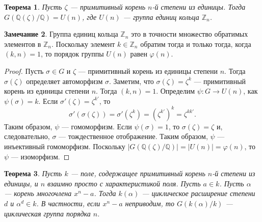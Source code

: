 \documentclass[12pt, titlepage, oneside]{amsbook}
\newcommand{\ZZ}{\mathbb{Z}}
\newcommand{\QQ}{\mathbb{Q}}
\newtheorem{theorem}{Теорема}[chapter]
\theoremstyle{definition}
\newtheorem{remark}[theorem]{Замечание}
\theoremstyle{remark}
\begin{document}
\begin{theorem}
\label{Edin2}
Пусть $\zeta$ --- примитивный корень $n$-й степени из единицы. Тогда $G(\QQ(\zeta)/\QQ)=U(n)$, где $U(n)$ --- группа единиц кольца $\ZZ_n$.
\end{theorem}

\begin{remark}
Группа единиц кольца $\ZZ_n$ это в точности множество обратимых элементов в $\ZZ_n$. Поскольку элемент $k\in\ZZ_n$ обратим тогда и только тогда, когда $(k,n)=1$, то порядок группы $U(n)$ равен $\varphi(n)$.
\end{remark}

\begin{proof}
Пусть $\sigma\in G$ и $\zeta$ --- примитивный корень из единицы степени $n$. Тогда $\sigma(\zeta)$ определяет автоморфизм $\sigma$. Заметим, что $\sigma(\zeta)=\zeta^k$ --- примитивный корень из единицы степени $n$. Тогда $(k,n)=1$. Определим $\psi\colon G\rightarrow U(n)$, как $\psi(\sigma)=k$. Если $\sigma'(\zeta)=\zeta^{k'}$, то $$\sigma'(\sigma(\zeta))=\sigma'(\zeta^k)=(\zeta^{k'})^k=\zeta^{kk'}.$$ Таким образом, $\psi$ --- гомоморфизм. Если $\psi(\sigma)=1$, то $\sigma(\zeta)=\zeta$ и, следовательно, $\sigma$ --- тождественное отображение. Таким образом, $\psi$ --- инъективный гомоморфизм. Поскольку $|G(\QQ(\zeta)/\QQ)|=|U(n)|=\varphi(n)$, то $\psi$ --- изоморфизм.
\end{proof}

\begin{theorem}
\label{Edin3}
Пусть $k$ --- поле, содержащее примитивный корень $n$-й степени из единицы, и $n$ взаимно просто с характеристикой поля. Пусть $a\in k$. Пусть $\alpha$ --- корень многочлена $x^n-a$. Тогда $k(\alpha)$ --- циклическое расширение степени $d$ и $\alpha^d\in k$. В частности, если $x^n-a$ неприводим, то $G(k(\alpha)/k)$ --- циклическая группа порядка $n$.
\end{theorem}
\end{document}

